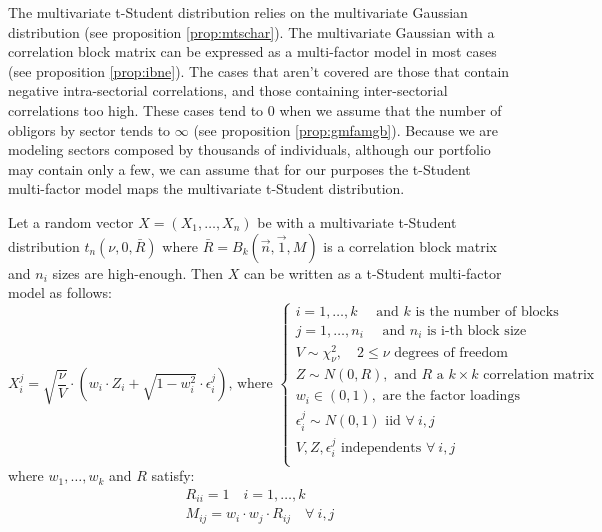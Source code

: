 \documentclass[11pt,fleqn]{book} %
\begin{document}
The multivariate t-Student distribution relies on the multivariate Gaussian
distribution (see proposition \ref{prop:mtschar}). The multivariate Gaussian 
with a correlation block matrix  can be expressed as a multi-factor model in 
most cases (see proposition \ref{prop:ibne}). The cases that aren't covered 
are those that contain negative intra-sectorial correlations, and those 
containing inter-sectorial correlations too high. These cases tend to $0$ 
when we assume that the number of obligors by sector tends to $\infty$
(see proposition \ref{prop:gmfamgb}). Because we are modeling 
sectors composed by thousands of individuals, although our portfolio may 
contain only a few, we can assume that for our purposes the t-Student 
multi-factor model maps the multivariate t-Student distribution.

\begin{proposition}
	\label{prop:tmfm}
	Let a random vector $X=(X_1,\dots,X_n)$ be with a multivariate t-Student 
	distribution $t_n(\nu,0,\bar{R})$ where $\bar{R} = B_k(\vec{n},\vec{1},M)$ 
	is a correlation block matrix and $n_i$ sizes are high-enough. 
	Then $X$ can be written as a t-Student multi-factor model as follows:
	\begin{displaymath}
		X_i^j = \sqrt{\frac{\nu}{V}} \cdot 
		\left( w_i \cdot Z_i + \sqrt{1-w_i^2} \cdot \epsilon_i^j \right)
		\text{, where } \left\{
		\begin{array}{l}
			i = 1, \dots, k \quad \text{ and $k$ is the number of blocks}      \\
			j = 1, \dots, n_i \quad \text{ and $n_i$ is i-th block size}       \\
			V \sim \chi_{\nu}^2, \quad 2 \le \nu \text{ degrees of freedom}    \\
			Z \sim N(0,R), \text{ and $R$ a $k {\times} k$ correlation matrix} \\
			w_i \in (0,1), \text{ are the factor loadings }                    \\
			\epsilon_i^j \sim N(0,1) \text { iid } \forall\ i,j                \\
			V, Z, \epsilon_i^j \text{ independents } \forall\ i,j              \\
		\end{array}
		\right.
	\end{displaymath}
	where $w_1,\dots,w_k$ and $R$ satisfy:
	\begin{displaymath}
		\begin{array}{l}
			R_{ii} = 1 \quad i = 1,\dots,k \\
			M_{ij} = w_i \cdot w_j \cdot R_{ij} \quad \forall\ i,j
		\end{array}
	\end{displaymath}
\end{proposition}
\end{document}
